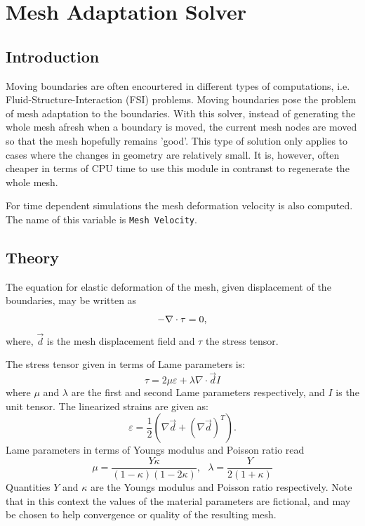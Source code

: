 \chapter{Mesh Adaptation Solver}


\section{Introduction}

Moving boundaries are often encourtered in different types of computations,
i.e. Fluid-Structure-Interaction (FSI) problems.
Moving boundaries pose the problem of mesh adaptation to the boundaries.
With this solver, instead of generating the
whole mesh afresh when a boundary is moved, the current mesh nodes are moved
so that the mesh hopefully remains 'good'. This type of solution only applies
to cases where the changes in geometry are relatively small. It is, however, 
often cheaper in terms of CPU time to use this module in contranst to regenerate
the whole mesh.

For time dependent simulations the mesh deformation velocity is also computed.
The name of this variable is {\tt Mesh Velocity}.

\section{Theory}

The equation for elastic deformation of the mesh, given displacement of the boundaries,
may be written as
\begin{equation}
-\nabla\cdot {\bf \tau} = 0,
\end{equation}
where, $\Vec{d}$ is the mesh displacement field and $\tau$ the stress tensor.

The stress tensor given in terms of Lame parameters is:
\begin{equation}
\tau = 2 \mu \varepsilon + \lambda\nabla\cdot\Vec{d} I
\end{equation}
where $\mu$ and $\lambda$ are the first and second Lame parameters respectively,
and $I$ is the unit tensor.
The linearized strains are given as:
\begin{equation}
\varepsilon = \frac{1}{2}(\nabla{\Vec{d}} + (\nabla{\Vec{d}})^T).
\end{equation}
Lame parameters in terms of Youngs modulus and
Poisson ratio read
\begin{equation}
 \mu = \frac{Y \kappa}{( 1 - \kappa ) ( 1-2\kappa )},\ \ \  
 \lambda = \frac{Y}{2(1+\kappa)}
\end{equation}
Quantities $Y$ and $\kappa$ are the Youngs modulus and Poisson ratio respectively.
Note that in this context the values of the material parameters are fictional, and may
be chosen to help convergence or quality of the resulting mesh.


